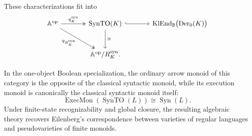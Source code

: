 These characterizations fit into
\[
\begin{tikzcd}[column sep=large, row sep=large]
    \mathbb A^{\mathrm{op}}
        \arrow[r, two heads, "q_K^{\mathrm{syn}}"]
        \arrow[dr, two heads,
        "{q_{R_K^{\mathrm{syn}}}}"']
    &
    \operatorname{SynTO}(K)
        \arrow[r, hook]
        \arrow[d, "\cong"]
    &
    \operatorname{KlEnd}_{\mathbb B}
    \bigl(\operatorname{Der}_0(K)\bigr)
    \\
    &
    \mathbb A^{\mathrm{op}}/R_K^{\mathrm{syn}}.
\end{tikzcd}
\]

In the one-object Boolean specialization, the ordinary arrow monoid of this
category is the opposite of the classical syntactic monoid, while its
execution monoid is canonically the classical syntactic monoid itself:
\[
    \operatorname{ExecMon}(\operatorname{SynTO}(L))
    \cong
    \operatorname{Syn}(L).
\]
Under finite-state recognizability and global closure, the resulting algebraic
theory recovers Eilenberg's correspondence between varieties of regular
languages and pseudovarieties of finite monoids.